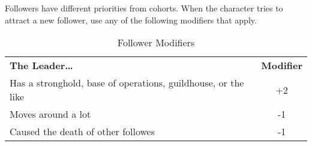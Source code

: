 Followers have different priorities from cohorts. When the character tries to attract 
a new follower, use any of the following modifiers that apply.

\begin{table}[htb]
\caption{Follower Modifiers}
\centering
\begin{tabular}{l c}
\textbf{The Leader\ldots{}} & \textbf{Modifier}\\
Has a stronghold, base of operations, guildhouse, or the like & +2\\
Moves around a lot & -1\\
Caused the death of other followes & -1\\
\end{tabular}
\end{table}

